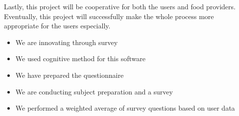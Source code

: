 Lastly, this project will be cooperative for both the users and food providers. Eventually, this project will successfully make the whole process more appropriate for the users especially.
\begin{itemize}
    \item We are innovating through survey
    \item We used cognitive method for this software
    \item We have prepared the questionnaire
    \item We are conducting subject preparation and a survey
    \item We performed a weighted average of survey questions based on user data
\end{itemize}




    



 
 



